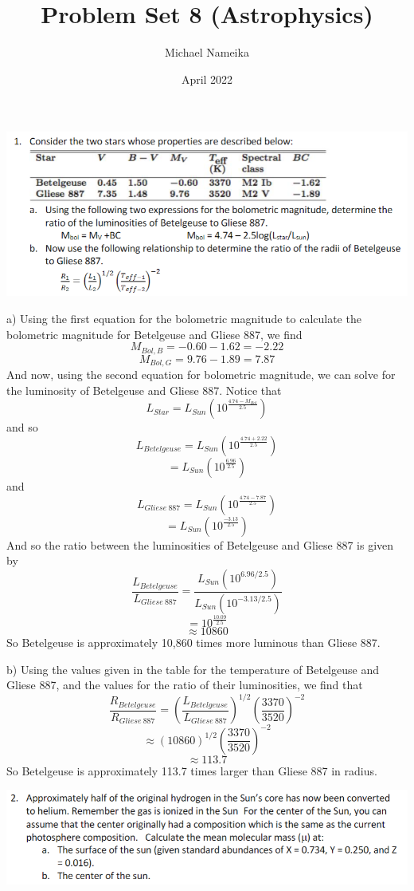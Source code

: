 \documentclass{article}
\title{Problem Set 8 (Astrophysics)}
\author{Michael Nameika}
\date{April 2022}
\begin{document}
\maketitle

\includegraphics[scale = 0.8]{probset8prob1.PNG}

a) Using the first equation for the bolometric magnitude to calculate the bolometric magnitude for Betelgeuse and Gliese 887, we find
\[M_{Bol,B} = -0.60 - 1.62 = -2.22\]
\[M_{Bol,G} = 9.76 - 1.89 = 7.87\]
And now, using the second equation for bolometric magnitude, we can solve for the luminosity of Betelgeuse and Gliese 887. Notice that
\[L_{Star} = L_{Sun}(10^{\frac{4.74 - M_{Bol}}{2.5}})\]
and so 
\[L_{Betelgeuse} = L_{Sun}(10^{\frac{4.74 + 2.22}{2.5}})\]
\[ = L_{Sun}(10^{\frac{6.96}{2.5}})\]
and
\[L_{Gliese \:887} = L_{Sun}(10^{\frac{4.74 - 7.87}{2.5}})\]
\[ = L_{Sun}(10^{\frac{-3.13}{2.5}})\]
And so the ratio between the luminosities of Betelgeuse and Gliese 887 is given by
\[\frac{L_{Betelgeuse}}{L_{Gliese \:887}} = \frac{L_{Sun}(10^{6.96/2.5})}{L_{Sun}(10^{-3.13/2.5})}\]
\[ = 10^{\frac{10.09}{2.5}}\]
\[\approx 10860\]
So Betelgeuse is approximately 10,860 times more luminous than Gliese 887.

b) Using the values given in the table for the temperature of Betelgeuse and Gliese 887, and the values for the ratio of their luminosities, we find that
\[\frac{R_{Betelgeuse}}{R_{Gliese \:887}} = \left(\frac{L_{Betelgeuse}}{L_{Gliese \:887}}\right)^{1/2}\left(\frac{3370}{3520}\right)^{-2}\]
\[\approx (10860)^{1/2}\left(\frac{3370}{3520}\right)^{-2}\]
\[\approx 113.7\]
So Betelgeuse is approximately 113.7 times larger than Gliese 887 in radius.
\newline

\includegraphics[scale = 0.8]{probset8prob2.PNG}
\newline
\end{document}
